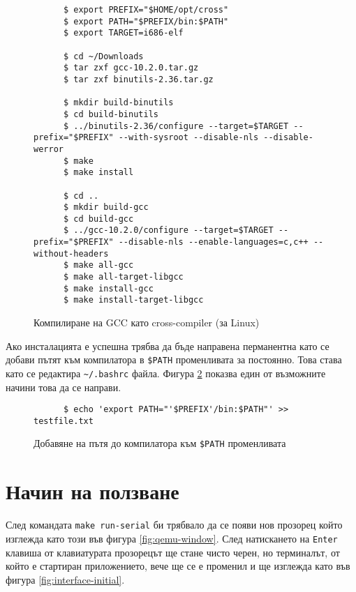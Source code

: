   \begin{figure}[htpb]
    \centering
    \begin{verbatim}
      $ export PREFIX="$HOME/opt/cross"
      $ export PATH="$PREFIX/bin:$PATH"
      $ export TARGET=i686-elf

      $ cd ~/Downloads
      $ tar zxf gcc-10.2.0.tar.gz
      $ tar zxf binutils-2.36.tar.gz

      $ mkdir build-binutils
      $ cd build-binutils
      $ ../binutils-2.36/configure --target=$TARGET --prefix="$PREFIX" --with-sysroot --disable-nls --disable-werror
      $ make
      $ make install

      $ cd ..
      $ mkdir build-gcc
      $ cd build-gcc
      $ ../gcc-10.2.0/configure --target=$TARGET --prefix="$PREFIX" --disable-nls --enable-languages=c,c++ --without-headers
      $ make all-gcc
      $ make all-target-libgcc
      $ make install-gcc
      $ make install-target-libgcc
    \end{verbatim}
    \caption{Компилиране на GCC като cross-compiler (за Linux)}
    \label{fig:compiling-gcc}
  \end{figure}

  Ако инсталацията е успешна трябва да бъде направена перманентна като се добави пътят към компилатора в {\tt \$PATH} променливата за постоянно. Това става като се редактира {\tt \~{}/.bashrc} файла. Фигура \ref{fig:adding-to-path} показва един от възможните начини това да се направи.

  \begin{figure}[htpb]
    \centering
    \begin{verbatim}
      $ echo 'export PATH="'$PREFIX'/bin:$PATH"' >> testfile.txt
    \end{verbatim}
    \caption{Добавяне на пътя до компилатора към {\tt \$PATH} променливата}
    \label{fig:adding-to-path}
  \end{figure}

  \section{Начин на ползване}
  След командата {\tt make run-serial} би трябвало да се появи нов прозорец който изглежда като този във фигура \ref{fig:qemu-window}. След натискането на {\tt Enter} клавиша от клавиатурата прозорецът ще стане чисто черен, но терминалът, от който е стартиран приложението, вече ще се е променил и ще изглежда като във фигура \ref{fig:interface-initial}.

